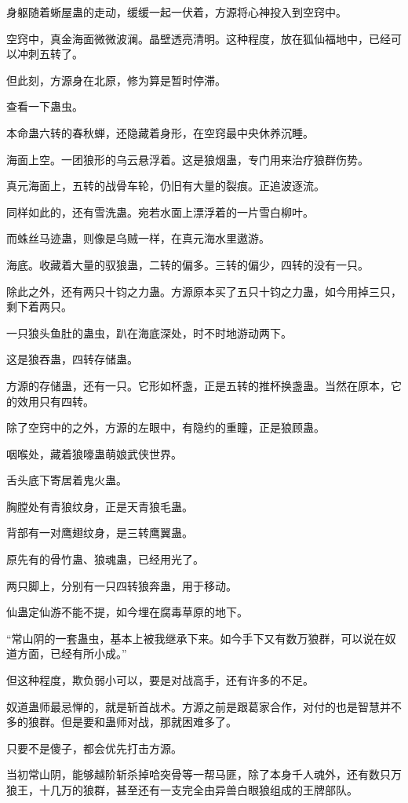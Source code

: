 \begin{this_body}
身躯随着蜥屋蛊的走动，缓缓一起一伏着，方源将心神投入到空窍中。

空窍中，真金海面微微波澜。晶壁透亮清明。这种程度，放在狐仙福地中，已经可以冲刺五转了。

但此刻，方源身在北原，修为算是暂时停滞。

查看一下蛊虫。

本命蛊六转的春秋蝉，还隐藏着身形，在空窍最中央休养沉睡。

海面上空。一团狼形的乌云悬浮着。这是狼烟蛊，专门用来治疗狼群伤势。

真元海面上，五转的战骨车轮，仍旧有大量的裂痕。正追波逐流。

同样如此的，还有雪洗蛊。宛若水面上漂浮着的一片雪白柳叶。

而蛛丝马迹蛊，则像是乌贼一样，在真元海水里遨游。

海底。收藏着大量的驭狼蛊，二转的偏多。三转的偏少，四转的没有一只。

除此之外，还有两只十钧之力蛊。方源原本买了五只十钧之力蛊，如今用掉三只，剩下着两只。

一只狼头鱼肚的蛊虫，趴在海底深处，时不时地游动两下。

这是狼吞蛊，四转存储蛊。

方源的存储蛊，还有一只。它形如杯盏，正是五转的推杯换盏蛊。当然在原本，它的效用只有四转。

除了空窍中的之外，方源的左眼中，有隐约的重瞳，正是狼顾蛊。

咽喉处，藏着狼嚎蛊萌娘武侠世界。

舌头底下寄居着鬼火蛊。

胸膛处有青狼纹身，正是天青狼毛蛊。

背部有一对鹰翅纹身，是三转鹰翼蛊。

原先有的骨竹蛊、狼魂蛊，已经用光了。

两只脚上，分别有一只四转狼奔蛊，用于移动。

仙蛊定仙游不能不提，如今埋在腐毒草原的地下。

“常山阴的一套蛊虫，基本上被我继承下来。如今手下又有数万狼群，可以说在奴道方面，已经有所小成。”

但这种程度，欺负弱小可以，要是对战高手，还有许多的不足。

奴道蛊师最忌惮的，就是斩首战术。方源之前是跟葛家合作，对付的也是智慧并不多的狼群。但是要和蛊师对战，那就困难多了。

只要不是傻子，都会优先打击方源。

当初常山阴，能够越阶斩杀掉哈突骨等一帮马匪，除了本身千人魂外，还有数只万狼王，十几万的狼群，甚至还有一支完全由异兽白眼狼组成的王牌部队。


\end{this_body}
